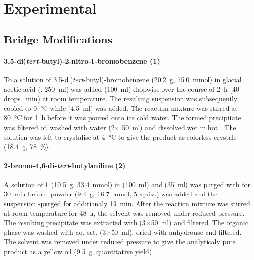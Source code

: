 \chapter{Experimental}

\section{Bridge Modifications}

\subsubsection*{3,5-di(\textit{tert}-butyl)-2-nitro-1-bromobenzene \textbf{(1)}}
To a solution of 3,5-di(\textit{tert}-butyl)-bromobenzene (\qty{20.2}{\g}, \qty{75.0}{\mmol}) in glacial acetic acid (, \qty{250}{\ml}) was added  (\qty{100}{\ml}) dropwise over the course of \qty{2}{\hour} (\num{40} drops \unit{\per\minute}) at room temperature. The resulting suspension was subsequently cooled to \qty{0}{\degreeCelsius} while  (\qty{4.5}{\ml}) was added. The reaction mixture was stirred at \qty{80}{\degreeCelsius} for \qty{1}{\hour} before it was poured onto ice cold water. The formed precipitate was filtered of, washed with water (2$\times$ \qty{50}{\ml}) and dissolved wet in hot . The solution was left to crystalise at \qty{4}{\degreeCelsius} to give the product as colorless crystals (\qty{18.4}{\g}, \qty{78}{\percent}).

\subsubsection*{2-bromo-4,6-di-\textit{tert}-butylaniline \textbf{(2)}}
A solution of \textbf{1} (\qty{10.5}{\g}, \qty{33.4}{\mmol}) in  (\qty{100}{\ml}) and  (\qty{35}{\ml}) was purged with  for \qty{30}{\minute} before -powder (\qty{9.4}{\g}, \qty{16.7}{\mmol}, \num{5}\,equiv.) was added and the suspension -purged for additionaly \qty{10}{\minute}. After the reaction mixture was stirred at room temperature for \qty{48}{\hour}, the solvent was removed under reduced pressure. The resulting precipitate was extracted with  (3$\times$\qty{50}{\ml}) and filtered. The organic phase was washed with aq. sat.  (3$\times$\qty{50}{\ml}), dried with anhydrouse  and filtered. The solvent was removed under reduced pressure to give the analyticaly pure product as a yellow oil (\qty{9.5}{\g}, quantitative yield).

